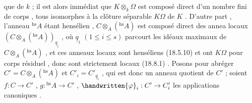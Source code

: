 que de $k$ ; il est alors immédiat que $K\otimes_k\Omega$ est composé direct d'un nombre
fini de corps , tous isomorphes à la clôture séparable $K\Omega$ de $K$ . D'autre
part , l'anneau $ {}^{\mathrm{hs}}A$ étant hensélien , $C\otimes_A({}^{\mathrm{hs}}A)$ est composé direct des annea
locaux $(C\otimes_A({}^{\mathrm{hs}}A))_{\underline{q}_i}$ , où $\underline{q}_i$ $(1\leq i\leq s)$ parcourt les idéaux maximaux de 
$C\otimes_A({}^{\mathrm{hs}}A)$ , et ces anneaux locaux sont henséliens (18.5.10) et ont $K\Omega$ pour
corps résiduel , donc sont strictement locaux (18.8.1) . Posons pour abréger
$C'=C\otimes_A({}^{\mathrm{hs}}A)$ et $C'_i=C'_{\underline{q}_i}$ , qui est donc un anneau quotient de $C'$ ; soient
$f:C\to C'$ , $g:{}^{\mathrm{hs}}A\to C'$ , $\handwritten{\varphi}_i:C'\to C'_i$ les applications canoniques .


